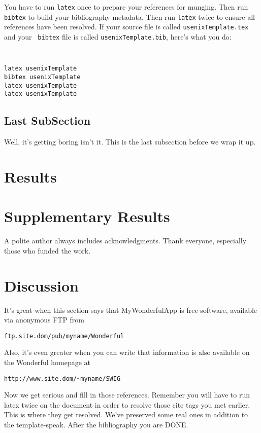 \documentclass[letterpaper,twocolumn,10pt]{article}
\begin{document}
You have to run {\tt latex} once to prepare your references for
munging.  Then run {\tt bibtex} to build your bibliography metadata.
Then run {\tt latex} twice to ensure all references have been resolved.
If your source file is called {\tt usenixTemplate.tex} and your {\tt
  bibtex} file is called {\tt usenixTemplate.bib}, here's what you do:
{\tt \small
\begin{verbatim}
latex usenixTemplate
bibtex usenixTemplate
latex usenixTemplate
latex usenixTemplate
\end{verbatim}
}


\subsection{Last SubSection}

Well, it's getting boring isn't it.  This is the last subsection
before we wrap it up.


\section{Results}

\section{Supplementary Results}

A polite author always includes acknowledgments.  Thank everyone,
especially those who funded the work. 

\section{Discussion}

It's great when this section says that MyWonderfulApp is free software, 
available via anonymous FTP from

\begin{center}
{\tt ftp.site.dom/pub/myname/Wonderful}\\
\end{center}

Also, it's even greater when you can write that information is also 
available on the Wonderful homepage at 

\begin{center}
{\tt http://www.site.dom/\~{}myname/SWIG}
\end{center}

Now we get serious and fill in those references.  Remember you will
have to run latex twice on the document in order to resolve those
cite tags you met earlier.  This is where they get resolved.
We've preserved some real ones in addition to the template-speak.
After the bibliography you are DONE.
\end{document}
